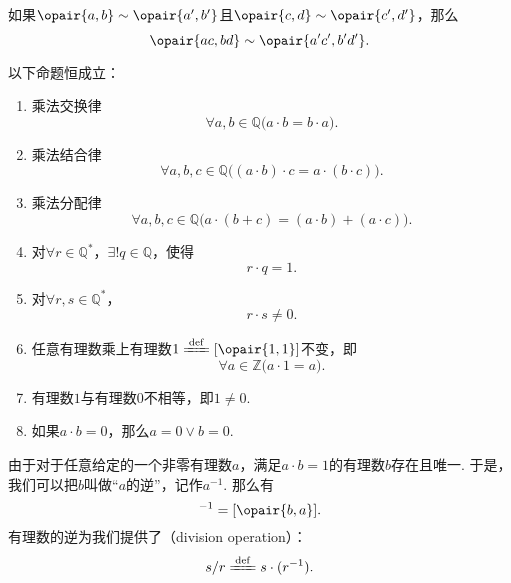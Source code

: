 \begin{lemma}\label{theorem:集合论.有理数集上的乘法运算是良定的}
如果\(\opair{a,b}\sim\opair{a',b'}\)且\(\opair{c,d}\sim\opair{c',d'}\)，那么\[
	\opair{ac,bd}\sim\opair{a'c',b'd'}.
\]
\end{lemma}

\begin{theorem}\label{theorem:集合论.有理数乘法的运算法则}
以下命题恒成立：
\begin{enumerate}
	\item 乘法交换律
	\begin{equation}\label{equation:集合论.有理数乘法交换律}
		\forall a,b\in\mathbb{Q} \bigl(
			a \cdot b = b \cdot a
		\bigr).
	\end{equation}
	\item 乘法结合律
	\begin{equation}\label{equation:集合论.有理数乘法结合律}
		\forall a,b,c\in\mathbb{Q} \bigl(
			(a \cdot b) \cdot c = a \cdot (b \cdot c)
		\bigr).
	\end{equation}
	\item 乘法分配律
	\begin{equation}\label{equation:集合论.有理数乘法分配律}
		\forall a,b,c\in\mathbb{Q} \bigl(
			a \cdot (b + c) = (a \cdot b) + (a \cdot c)
		\bigr).
	\end{equation}
	\item 对\(\forall r\in\mathbb{Q}^*\)，\(\exists! q\in\mathbb{Q}\)，使得\[
		r \cdot q = 1.
	\]
	\item 对\(\forall r,s\in\mathbb{Q}^*\)，\[
		r \cdot s \neq 0.
	\]
	\item 任意有理数乘上有理数\(1\defeq[\opair{1,1}]\)不变，即
	\begin{equation}\label{equation:集合论.任意有理数乘上一不变}
		\forall a\in\mathbb{Z} \bigl(
			a \cdot 1 = a
		\bigr).
	\end{equation}
	\item 有理数\(1\)与有理数\(0\)不相等，即\(1\neq0\).
	\item 如果\(a \cdot b = 0\)，那么\(a = 0 \lor b = 0\).
\end{enumerate}
\end{theorem}

由于对于任意给定的一个非零有理数\(a\)，满足\(a \cdot b = 1\)的有理数\(b\)存在且唯一.
于是，我们可以把\(b\)叫做“\(a\)的逆”，记作\(a^{-1}\).
那么有\begin{equation}
	[\opair{a,b}]^{-1}=[\opair{b,a}].
\end{equation}
有理数的逆为我们提供了（division operation）：
\begin{equation}
	s/r \defeq s \cdot (r^{-1}).
\end{equation}

